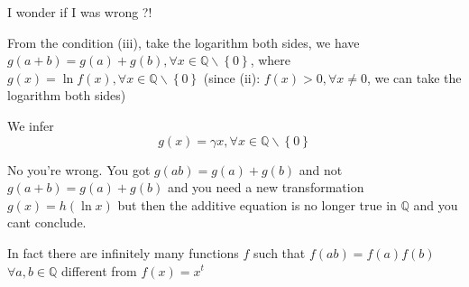 \begin{solution}
	\begin{tcolorbox}I wonder if I was wrong ?!

From the condition (iii), take the logarithm both sides, we have $g\left( {a + b} \right) = g\left( a \right) + g\left( b \right),\forall x \in \mathbb{Q}\backslash \left\{ 0 \right\}$, where $g\left( x \right) = \ln f\left( x \right),\forall x \in \mathbb{Q}\backslash \left\{ 0 \right\}$
(since (ii): $f(x)>0, \forall x \ne 0$, we can take the logarithm both sides)

We infer
\[g\left( x \right) = \gamma x,\forall x \in \mathbb{Q}\backslash \left\{ 0 \right\}\]
\end{tcolorbox}
No you're wrong. You got $g(ab)=g(a)+g(b)$ and not $g(a+b)=g(a)+g(b)$ and you need a new transformation $g(x)=h(\ln x)$ but then the additive equation is no longer true in $\mathbb Q$ and you cant conclude.

In fact there are infinitely many functions $f$ such that $f(ab)=f(a)f(b)$ $\forall a,b\in\mathbb Q$ different from $f(x)=x^t$
\end{solution}



